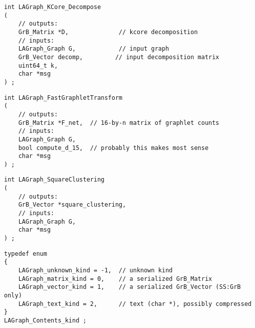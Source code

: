 \begin{verbatim}
int LAGraph_KCore_Decompose
(
    // outputs:
    GrB_Matrix *D,              // kcore decomposition
    // inputs:
    LAGraph_Graph G,            // input graph
    GrB_Vector decomp,         // input decomposition matrix
    uint64_t k,
    char *msg
) ;
\end{verbatim}




\begin{verbatim}
int LAGraph_FastGraphletTransform
(
    // outputs:
    GrB_Matrix *F_net,  // 16-by-n matrix of graphlet counts
    // inputs:
    LAGraph_Graph G,
    bool compute_d_15,  // probably this makes most sense
    char *msg
) ;
\end{verbatim}




\begin{verbatim}
int LAGraph_SquareClustering
(
    // outputs:
    GrB_Vector *square_clustering,
    // inputs:
    LAGraph_Graph G,
    char *msg
) ;
\end{verbatim}




\begin{verbatim}
typedef enum
{
    LAGraph_unknown_kind = -1,  // unknown kind
    LAGraph_matrix_kind = 0,    // a serialized GrB_Matrix
    LAGraph_vector_kind = 1,    // a serialized GrB_Vector (SS:GrB only)
    LAGraph_text_kind = 2,      // text (char *), possibly compressed
}
LAGraph_Contents_kind ;
\end{verbatim}




